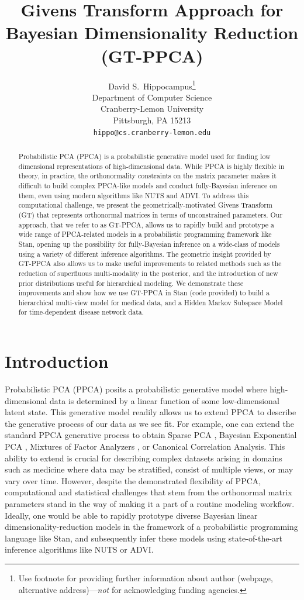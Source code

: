 \documentclass{article}
\title{Givens Transform Approach for Bayesian Dimensionality Reduction (GT-PPCA)}
\author{
  David S.~Hippocampus\thanks{Use footnote for providing further
    information about author (webpage, alternative
    address)---\emph{not} for acknowledging funding agencies.} \\
  Department of Computer Science\\
  Cranberry-Lemon University\\
  Pittsburgh, PA 15213 \\
  \texttt{hippo@cs.cranberry-lemon.edu} \\
}
\begin{document}

\maketitle

\begin{abstract}
Probabilistic PCA (PPCA) is a probabilistic generative model used for finding low dimensional representations of high-dimensional data. While PPCA is highly flexible in theory, in practice, the orthonormality constraints on the matrix parameter makes it difficult to build complex PPCA-like models and conduct fully-Bayesian inference on them, even using modern algorithms like NUTS and ADVI. To address this computational challenge, we present the geometrically-motivated Givens Transform (GT) that represents orthonormal matrices in terms of unconstrained parameters. Our approach, that we refer to as GT-PPCA, allows us to rapidly build and prototype a wide range of PPCA-related models in a probabilistic programming framework like Stan, opening up the possibility for fully-Bayesian inference on a wide-class of models using a variety of different inference algorithms. The geometric insight provided by GT-PPCA also allows us to make useful improvements to related methods such as the reduction of superfluous multi-modality in the posterior, and the introduction of new prior distributions useful for hierarchical modeling. We demonstrate these improvements and show how we use GT-PPCA in Stan (code provided) to build a hierarchical multi-view model for medical data, and a Hidden Markov Subspace Model for time-dependent disease network data.
\end{abstract}

\section{Introduction}

Probabilistic PCA (PPCA) \citep{tipping1999probabilistic} posits a probabilistic generative model where high-dimensional data is determined by a linear function of some low-dimensional latent state. This generative model readily allows us to extend PPCA to describe the generative process of our data as we see fit. For example, one can extend the standard PPCA generative process to obtain Sparse PCA \citep{hoff2009simulation}, Bayesian Exponential PCA \citep{mohamed2009bayesian}, Mixtures of Factor Analyzers \citep{ghahramani1996algorithm}, or Canonical Correlation Analysis. This ability to extend is crucial for describing complex datasets arising in domains such as medicine where data may be stratified, consist of multiple views, or may vary over time. However, despite the demonstrated flexibility of PPCA, computational and statistical challenges that stem from the orthonormal matrix parameters stand in the way of making it a part of a routine modeling workflow. Ideally, one would be able to rapidly prototype diverse Bayesian linear dimensionality-reduction models in the framework of a probabilistic programming language like Stan, and subsequently infer these models using state-of-the-art inference algorithms like NUTS or ADVI. 
\end{document}

